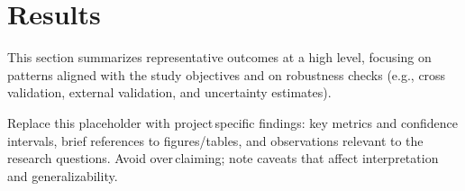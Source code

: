 \section{Results}

\noindent This section summarizes representative outcomes at a high level, focusing on patterns aligned with the study objectives and on robustness checks (e.g., cross\,validation, external validation, and uncertainty estimates).

\noindent Replace this placeholder with project\,specific findings: key metrics and confidence intervals, brief references to figures/tables, and observations relevant to the research questions. Avoid over\,claiming; note caveats that affect interpretation and generalizability.
